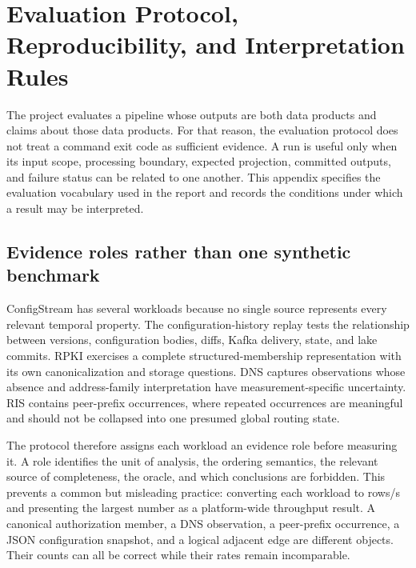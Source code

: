 
\section{Evaluation Protocol, Reproducibility, and Interpretation Rules}
\label{app:evaluation-protocol}

The project evaluates a pipeline whose outputs are both data products and claims about those data products. For that reason, the evaluation protocol does not treat a command exit code as sufficient evidence. A run is useful only when its input scope, processing boundary, expected projection, committed outputs, and failure status can be related to one another. This appendix specifies the evaluation vocabulary used in the report and records the conditions under which a result may be interpreted.

\subsection{Evidence roles rather than one synthetic benchmark}

ConfigStream has several workloads because no single source represents every relevant temporal property. The configuration-history replay tests the relationship between versions, configuration bodies, diffs, Kafka delivery, state, and lake commits. RPKI exercises a complete structured-membership representation with its own canonicalization and storage questions. DNS captures observations whose absence and address-family interpretation have measurement-specific uncertainty. RIS contains peer-prefix occurrences, where repeated occurrences are meaningful and should not be collapsed into one presumed global routing state.

The protocol therefore assigns each workload an evidence role before measuring it. A role identifies the unit of analysis, the ordering semantics, the relevant source of completeness, the oracle, and which conclusions are forbidden. This prevents a common but misleading practice: converting each workload to rows/s and presenting the largest number as a platform-wide throughput result. A canonical authorization member, a DNS observation, a peer-prefix occurrence, a JSON configuration snapshot, and a logical adjacent edge are different objects. Their counts can all be correct while their rates remain incomparable.

